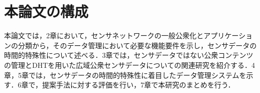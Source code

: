 
\section{本論文の構成}
本論文では，2章において，センサネットワークの一般公衆化とアプリケーションの分類から，そのデータ管理において必要な機能要件を示し，センサデータの時間的特殊性について述べる．3章では，センサデータではない公衆コンテンツの管理とDHTを用いた広域公衆センサデータについての関連研究を紹介する．4章，5章では，センサデータの時間的特殊性に着目したデータ管理システムを示す．6章で，提案手法に対する評価を行い，7章で本研究のまとめを行う．
